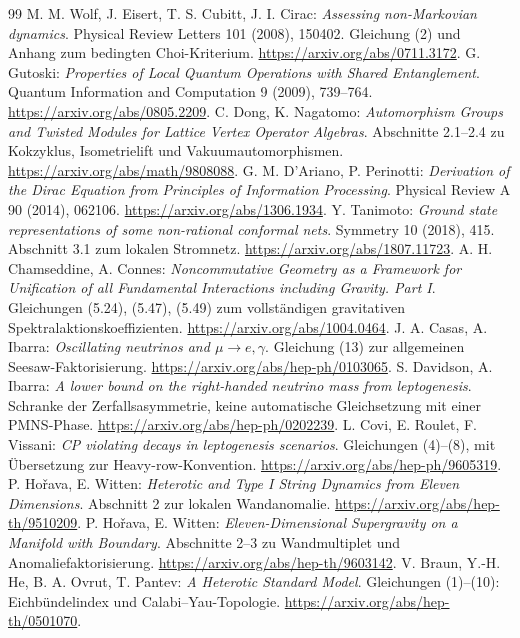 \begin{thebibliography}{99}
 M. M. Wolf, J. Eisert, T. S. Cubitt, J. I. Cirac: \emph{Assessing non-Markovian dynamics}. Physical Review Letters 101 (2008), 150402. Gleichung (2) und Anhang zum bedingten Choi-Kriterium. \url{https://arxiv.org/abs/0711.3172}.
 G. Gutoski: \emph{Properties of Local Quantum Operations with Shared Entanglement}. Quantum Information and Computation 9 (2009), 739--764. \url{https://arxiv.org/abs/0805.2209}.
 C. Dong, K. Nagatomo: \emph{Automorphism Groups and Twisted Modules for Lattice Vertex Operator Algebras}. Abschnitte 2.1--2.4 zu Kokzyklus, Isometrielift und Vakuumautomorphismen. \url{https://arxiv.org/abs/math/9808088}.
 G. M. D'Ariano, P. Perinotti: \emph{Derivation of the Dirac Equation from Principles of Information Processing}. Physical Review A 90 (2014), 062106. \url{https://arxiv.org/abs/1306.1934}.
 Y. Tanimoto: \emph{Ground state representations of some non-rational conformal nets}. Symmetry 10 (2018), 415. Abschnitt 3.1 zum lokalen Stromnetz. \url{https://arxiv.org/abs/1807.11723}.
 A. H. Chamseddine, A. Connes: \emph{Noncommutative Geometry as a Framework for Unification of all Fundamental Interactions including Gravity. Part I}. Gleichungen (5.24), (5.47), (5.49) zum vollständigen gravitativen Spektralaktionskoeffizienten. \url{https://arxiv.org/abs/1004.0464}.
 J. A. Casas, A. Ibarra: \emph{Oscillating neutrinos and $\mu\to e,\gamma$}. Gleichung (13) zur allgemeinen Seesaw-Faktorisierung. \url{https://arxiv.org/abs/hep-ph/0103065}.
 S. Davidson, A. Ibarra: \emph{A lower bound on the right-handed neutrino mass from leptogenesis}. Schranke der Zerfallsasymmetrie, keine automatische Gleichsetzung mit einer PMNS-Phase. \url{https://arxiv.org/abs/hep-ph/0202239}.
 L. Covi, E. Roulet, F. Vissani: \emph{CP violating decays in leptogenesis scenarios}. Gleichungen (4)--(8), mit Übersetzung zur Heavy-row-Konvention. \url{https://arxiv.org/abs/hep-ph/9605319}.
 P. Hořava, E. Witten: \emph{Heterotic and Type I String Dynamics from Eleven Dimensions}. Abschnitt 2 zur lokalen Wandanomalie. \url{https://arxiv.org/abs/hep-th/9510209}.
 P. Hořava, E. Witten: \emph{Eleven-Dimensional Supergravity on a Manifold with Boundary}. Abschnitte 2--3 zu Wandmultiplet und Anomaliefaktorisierung. \url{https://arxiv.org/abs/hep-th/9603142}.
 V. Braun, Y.-H. He, B. A. Ovrut, T. Pantev: \emph{A Heterotic Standard Model}. Gleichungen (1)--(10): Eichbündelindex und Calabi--Yau-Topologie. \url{https://arxiv.org/abs/hep-th/0501070}.

\end{thebibliography}
